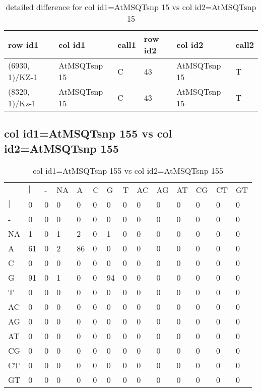 \begin{center}
\begin{longtable}{|l|l|l|l|l|l|}
\caption{detailed difference for col id1=AtMSQTsnp 15 vs col id2=AtMSQTsnp 15} \label{table_dm727}\\
\hline
row id1&col id1&call1&row id2&col id2&call2\\
\hline
(6930, 1)/KZ-1&AtMSQTsnp 15&C&43&AtMSQTsnp 15&T\\
(8320, 1)/Kz-1&AtMSQTsnp 15&C&43&AtMSQTsnp 15&T\\
\hline
\end{longtable}
\end{center}

\subsection{col id1=AtMSQTsnp 155 vs col id2=AtMSQTsnp 155}
\begin{center}
\begin{longtable}{|l|l|l|l|l|l|l|l|l|l|l|l|l|l|}
\caption{col id1=AtMSQTsnp 155 vs col id2=AtMSQTsnp 155} \label{table_dm728}\\
\hline
\\
\hline
&$|$&-&NA&A&C&G&T&AC&AG&AT&CG&CT&GT\\
$|$&0&0&0&0&0&0&0&0&0&0&0&0&0\\
-&0&0&0&0&0&0&0&0&0&0&0&0&0\\
NA&1&0&1&2&0&1&0&0&0&0&0&0&0\\
A&61&0&2&86&0&0&0&0&0&0&0&0&0\\
C&0&0&0&0&0&0&0&0&0&0&0&0&0\\
G&91&0&1&0&0&94&0&0&0&0&0&0&0\\
T&0&0&0&0&0&0&0&0&0&0&0&0&0\\
AC&0&0&0&0&0&0&0&0&0&0&0&0&0\\
AG&0&0&0&0&0&0&0&0&0&0&0&0&0\\
AT&0&0&0&0&0&0&0&0&0&0&0&0&0\\
CG&0&0&0&0&0&0&0&0&0&0&0&0&0\\
CT&0&0&0&0&0&0&0&0&0&0&0&0&0\\
GT&0&0&0&0&0&0&0&0&0&0&0&0&0\\
\hline
\end{longtable}
\end{center}

